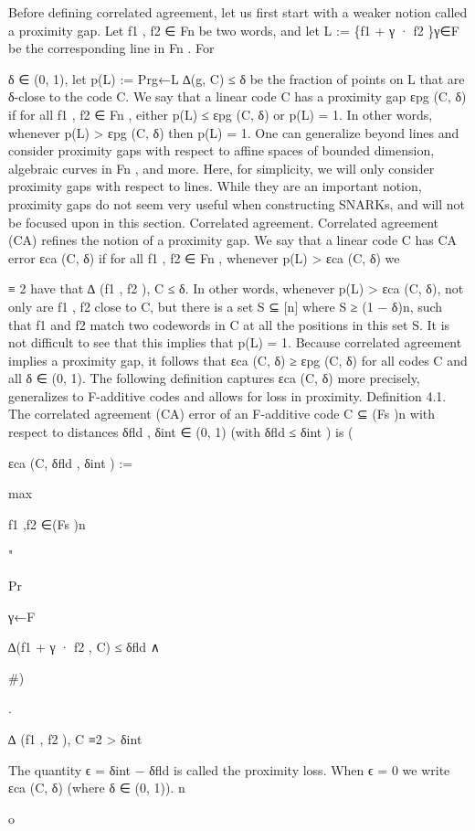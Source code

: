 \documentclass[11pt]{article}
\begin{document}
Before defining correlated agreement, let us first start with a weaker notion called a proximity gap.
Let f1 , f2 ∈ Fn be two words, and let L :=
\{f1 + γ · f2 \}γ∈F be the corresponding line in Fn . For

δ ∈ (0, 1), let p(L) := Prg←L ∆(g, C) ≤ δ be the fraction of points on L that are δ-close to the
code C. We say that a linear code C has a proximity gap εpg (C, δ) if for all f1 , f2 ∈ Fn , either
p(L) ≤ εpg (C, δ) or p(L) = 1. In other words, whenever p(L) > εpg (C, δ) then p(L) = 1. One
can generalize beyond lines and consider proximity gaps with respect to affine spaces of bounded
dimension, algebraic curves in Fn , and more. Here, for simplicity, we will only consider proximity
gaps with respect to lines.
While they are an important notion, proximity gaps do not seem very useful when constructing
SNARKs, and will not be focused upon in this section.
Correlated agreement. Correlated agreement (CA) refines the notion of a proximity gap. We
say that a linear code C has
CA error εca (C, δ) if for all f1 , f2 ∈ Fn , whenever p(L) > εca (C, δ) we

≡
2
have that ∆ (f1 , f2 ), C
≤ δ. In other words, whenever p(L) > εca (C, δ), not only are f1 , f2 close
to C, but there is a set S ⊆ [n] where S ≥ (1 − δ)n, such that f1 and f2 match two codewords in C
at all the positions in this set S. It is not difficult to see that this implies that p(L) = 1. Because
correlated agreement implies a proximity gap, it follows that εca (C, δ) ≥ εpg (C, δ) for all codes C and
all δ ∈ (0, 1). The following definition captures εca (C, δ) more precisely, generalizes to F-additive
codes and allows for loss in proximity.
Definition 4.1. The correlated agreement (CA) error of an F-additive code C ⊆ (Fs )n with
respect to distances δfld , δint ∈ (0, 1) (with δfld ≤ δint ) is
(

εca (C, δfld , δint ) :=

max

f1 ,f2 ∈(Fs )n

"

Pr

γ←F

∆(f1 + γ · f2 , C) ≤ δfld ∧

\#)

.

∆ (f1 , f2 ), C ≡2 > δint


The quantity ϵ = δint − δfld is called the proximity loss. When ϵ = 0 we write εca (C, δ) (where
δ ∈ (0, 1)).
n

o
\end{document}

